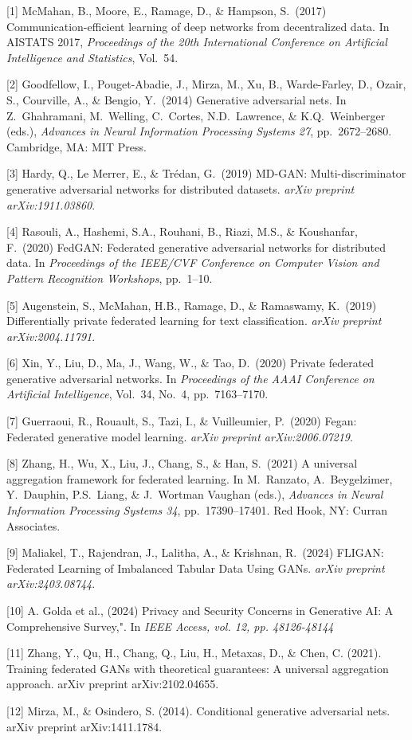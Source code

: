 \documentclass{article}
\begin{document}
{
\small
[1] McMahan, B., Moore, E., Ramage, D., \& Hampson, S.\ (2017) Communication-efficient learning of deep networks from decentralized data. In AISTATS 2017, {\it Proceedings of the 20th International Conference on Artificial Intelligence and Statistics}, Vol.\ 54.

[2] Goodfellow, I., Pouget-Abadie, J., Mirza, M., Xu, B., Warde-Farley, D., Ozair, S., Courville, A., \& Bengio, Y.\ (2014) Generative adversarial nets. In Z.\ Ghahramani, M.\ Welling, C.\ Cortes, N.D.\ Lawrence, \& K.Q.\ Weinberger (eds.), {\it Advances in Neural Information Processing Systems 27}, pp.\ 2672--2680. Cambridge, MA: MIT Press.

[3] Hardy, Q., Le Merrer, E., \& Trédan, G.\ (2019) MD-GAN: Multi-discriminator generative adversarial networks for distributed datasets. {\it arXiv preprint arXiv:1911.03860}.

[4] Rasouli, A., Hashemi, S.A., Rouhani, B., Riazi, M.S., \& Koushanfar, F.\ (2020) FedGAN: Federated generative adversarial networks for distributed data. In {\it Proceedings of the IEEE/CVF Conference on Computer Vision and Pattern Recognition Workshops}, pp.\ 1--10.

[5] Augenstein, S., McMahan, H.B., Ramage, D., \& Ramaswamy, K.\ (2019) Differentially private federated learning for text classification. {\it arXiv preprint arXiv:2004.11791}.

[6] Xin, Y., Liu, D., Ma, J., Wang, W., \& Tao, D.\ (2020) Private federated generative adversarial networks. In {\it Proceedings of the AAAI Conference on Artificial Intelligence}, Vol.\ 34, No.\ 4, pp.\ 7163--7170.

[7] Guerraoui, R., Rouault, S., Tazi, I., \& Vuilleumier, P.\ (2020) Fegan: Federated generative model learning. {\it arXiv preprint arXiv:2006.07219}.

[8] Zhang, H., Wu, X., Liu, J., Chang, S., \& Han, S.\ (2021) A universal aggregation framework for federated learning. In M.\ Ranzato, A.\ Beygelzimer, Y.\ Dauphin, P.S.\ Liang, \& J.\ Wortman Vaughan (eds.), {\it Advances in Neural Information Processing Systems 34}, pp.\ 17390--17401. Red Hook, NY: Curran Associates.

[9] Maliakel, T., Rajendran, J., Lalitha, A., \& Krishnan, R.\ (2024) FLIGAN: Federated Learning of Imbalanced Tabular Data Using GANs. {\it arXiv preprint arXiv:2403.08744}.

[10] A. Golda et al., (2024) Privacy and Security Concerns in Generative AI: A Comprehensive Survey,". In \it{IEEE Access, vol. 12, pp. 48126-48144}

[11] Zhang, Y., Qu, H., Chang, Q., Liu, H., Metaxas, D., & Chen, C. (2021). Training federated GANs with theoretical guarantees: A universal aggregation approach. arXiv preprint arXiv:2102.04655.

[12] Mirza, M., & Osindero, S. (2014). Conditional generative adversarial nets. arXiv preprint arXiv:1411.1784.
}
\end{document}
